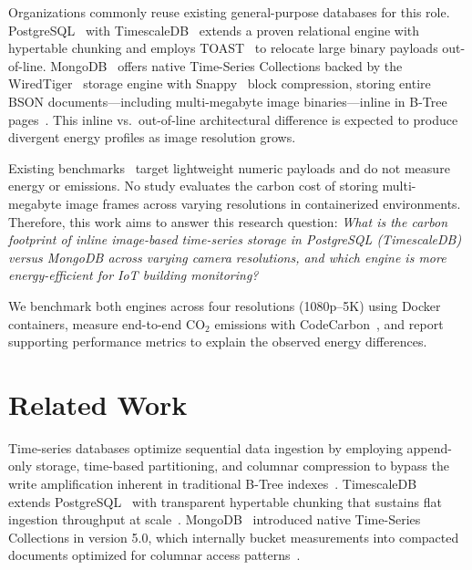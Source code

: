 \documentclass[conference]{IEEEtran}
\begin{document}
Organizations commonly reuse existing general-purpose databases for this role. PostgreSQL~\cite{postgresql_official} with TimescaleDB~\cite{timescaledb_official} extends a proven relational engine with hypertable chunking and employs TOAST~\cite{postgresql_toast_docs} to relocate large binary payloads out-of-line. MongoDB~\cite{mongodb_official} offers native Time-Series Collections backed by the WiredTiger~\cite{mongodb_wiredtiger_storage} storage engine with Snappy~\cite{google_snappy} block compression, storing entire BSON documents---including multi-megabyte image binaries---inline in B-Tree pages~\cite{timescale_mongodb_comparison}. This inline vs.\ out-of-line architectural difference is expected to produce divergent energy profiles as image resolution grows.

Existing benchmarks~\cite{tsbs,cratedb_ts_benchmark,diva_timescaledb_mongodb_eval} target lightweight numeric payloads and do not measure energy or emissions. No study evaluates the carbon cost of storing multi-megabyte image frames across varying resolutions in containerized environments. Therefore, this work aims to answer this research question: \textit{What is the carbon footprint of inline image-based time-series storage in PostgreSQL (TimescaleDB) versus MongoDB across varying camera resolutions, and which engine is more energy-efficient for IoT building monitoring?}

We benchmark both engines across four resolutions (1080p--5K) using Docker containers, measure end-to-end CO$_2$ emissions with CodeCarbon~\cite{codecarbon}, and report supporting performance metrics to explain the observed energy differences.

\section{Related Work}
\label{sec:related_work}

Time-series databases optimize sequential data ingestion by employing append-only storage, time-based partitioning, and columnar compression to bypass the write amplification inherent in traditional B-Tree indexes~\cite{dewaal_timeseries_survey,jensen_tsms_survey}. TimescaleDB~\cite{timescaledb_official} extends PostgreSQL~\cite{postgresql_official} with transparent hypertable chunking that sustains flat ingestion throughput at scale~\cite{dewaal_timeseries_survey,nerc_tsdb_survey}. MongoDB~\cite{mongodb_official} introduced native Time-Series Collections in version 5.0, which internally bucket measurements into compacted documents optimized for columnar access patterns~\cite{timescale_mongodb_bad_idea,mongodb_ts_best_practices}.
\end{document}
